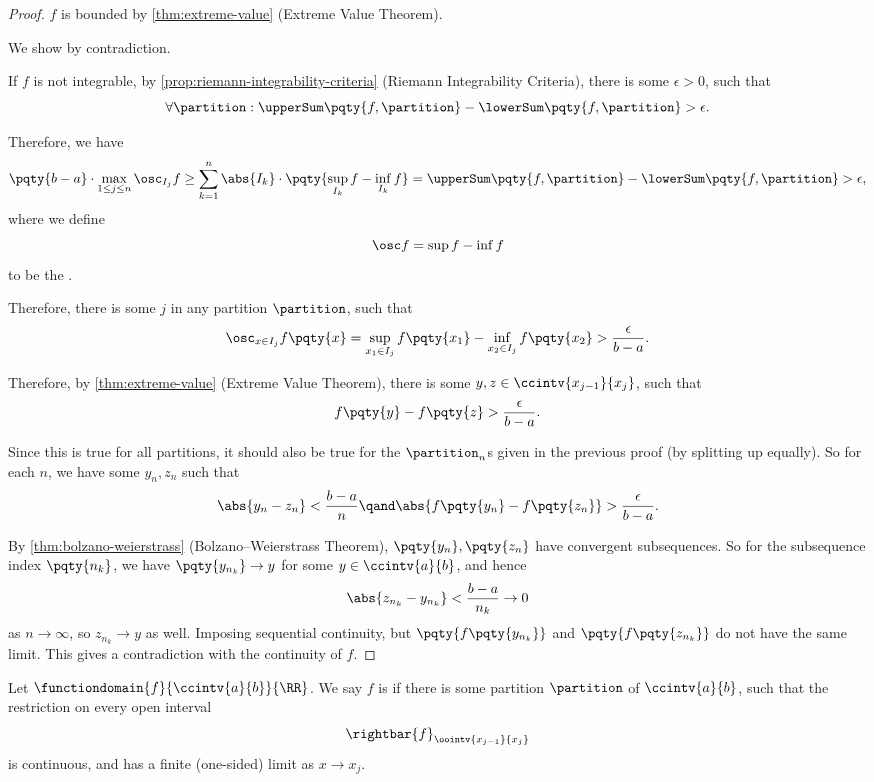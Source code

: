 \begin{proof}
    \(f\) is bounded by \autoref{thm:extreme-value} (Extreme Value Theorem).

    We show by contradiction.

    If \(f\) is not integrable, by \autoref{prop:riemann-integrability-criteria} (Riemann Integrability Criteria), there is some \(\epsilon > 0\), such that
    \[
        \forall \partition: \upperSum\pqty{f, \partition} - \lowerSum\pqty{f, \partition} > \epsilon.
    \]

    Therefore, we have
    \[
        \pqty{b - a} \cdot \max_{1 \leq j \leq n} \osc_{I_j} f \geq \sum_{k = 1}^{n} \abs{I_k} \cdot \pqty{\sup_{I_k} f - \inf_{I_k} f} = \upperSum\pqty{f, \partition} - \lowerSum\pqty{f, \partition} > \epsilon,
    \]
    where we define
    \[
        \osc f = \sup f - \inf f
    \]
    to be the .

    Therefore, there is some \(j\) in any partition \(\partition\), such that
    \[
        \osc_{x \in I_j} f\pqty{x} = \sup_{x_1 \in I_j} f\pqty{x_1} - \inf_{x_2 \in I_j} f\pqty{x_2} > \frac{\epsilon}{b - a}.
    \]

    Therefore, by \autoref{thm:extreme-value} (Extreme Value Theorem), there is some \(y, z \in \ccintv{x_{j - 1}}{x_j}\), such that
    \[
        f\pqty{y} - f\pqty{z} > \frac{\epsilon}{b - a}.
    \]

    Since this is true for all partitions, it should also be true for the \(\partition_n\)s given in the previous proof (by splitting up equally). So for each \(n\), we have some \(y_n, z_n\) such that
    \[
        \abs{y_n - z_n} < \frac{b - a}{n} \qand \abs{f\pqty{y_n} - f\pqty{z_n}} > \frac{\epsilon}{b - a}.
    \]

    By \autoref{thm:bolzano-weierstrass} (Bolzano--Weierstrass Theorem), \(\pqty{y_n}, \pqty{z_n}\) have convergent subsequences. So for the subsequence index \(\pqty{n_k}\), we have \(\pqty{y_{n_k}} \to y\) for some \(y \in \ccintv{a}{b}\), and hence
    \[
        \abs{z_{n_k} - y_{n_k}} < \frac{b - a}{n_k} \to 0
    \]
    as \(n \to \infty\), so \(z_{n_k} \to y\) as well. Imposing sequential continuity, but \(\pqty{f\pqty{y_{n_k}}}\) and \(\pqty{f\pqty{z_{n_k}}}\) do not have the same limit. This gives a contradiction with the continuity of \(f\).
\end{proof}

\begin{definition}
    \label{def:piecewise-continuous}%
    Let \(\functiondomain{f}{\ccintv{a}{b}}{\RR}\). We say \(f\) is  if there is some partition \(\partition\) of \(\ccintv{a}{b}\), such that the restriction on every open interval
    \[
        \rightbar{f}_{\oointv{x_{j - 1}}{x_j}}
    \]
    is continuous, and has a finite (one-sided) limit as \(x \to x_j\).
\end{definition}

